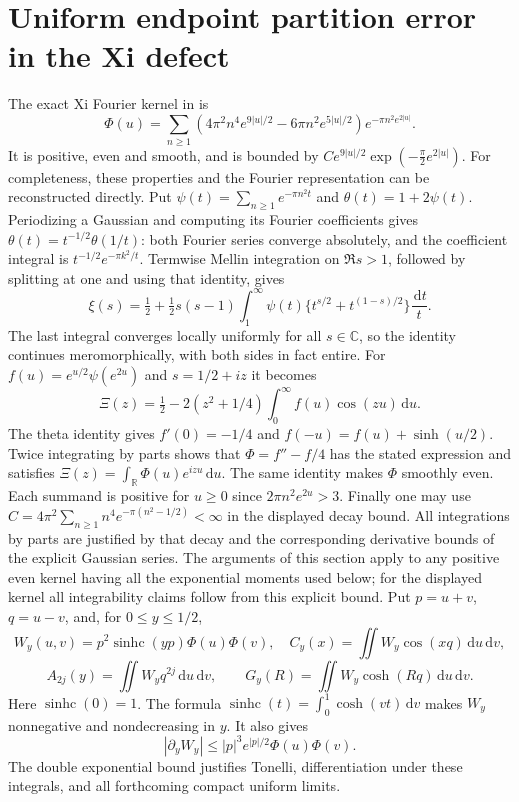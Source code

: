 \documentclass[11pt]{article}
\theoremstyle{remark}\newtheorem{remark}[theorem]{Remark}
\newcommand{\R}{\mathbb R}
\newcommand{\C}{\mathbb C}
\newcommand{\dd}{\,\mathrm d}
\newcommand{\sinhc}{\operatorname{sinhc}}
\begin{document}
\section{Uniform endpoint partition error in the Xi defect}
The exact Xi Fourier kernel in \cite[eqs. (\texttt{phi}),
(\texttt{decay})]{XiSource} is
\[
 \Phi(u)=\sum_{n\ge1}(4\pi^2n^4e^{9|u|/2}-6\pi n^2e^{5|u|/2})
             e^{-\pi n^2e^{2|u|}}.
\]
It is positive, even and smooth, and is bounded by
$C e^{9|u|/2}\exp(-\frac\pi2e^{2|u|})$.
For completeness, these properties and the Fourier representation can be
reconstructed directly. Put $\psi(t)=\sum_{n\ge1}e^{-\pi n^2t}$ and
$\theta(t)=1+2\psi(t)$. Periodizing a Gaussian and computing its Fourier
coefficients gives $\theta(t)=t^{-1/2}\theta(1/t)$: both Fourier series
converge absolutely, and the coefficient integral is
$t^{-1/2}e^{-\pi k^2/t}$.
Termwise Mellin integration on $\Re s>1$, followed by splitting at one
and using that identity, gives
\[
 \xi(s)=\tfrac12+\tfrac12s(s-1)
 \int_1^\infty\psi(t)
      \{t^{s/2}+t^{(1-s)/2}\}\frac{\dd t}{t}.
\]
The last integral converges locally uniformly for all $s\in\C$, so the
identity continues meromorphically, with both sides in fact entire.
For $f(u)=e^{u/2}\psi(e^{2u})$ and $s=1/2+iz$ it becomes
\[
 \Xi(z)=\tfrac12-2(z^2+1/4)\int_0^\infty f(u)\cos(zu)\dd u.
\]
The theta identity gives $f'(0)=-1/4$ and
$f(-u)=f(u)+\sinh(u/2)$. Twice integrating by parts shows that
$\Phi=f''-f/4$ has the stated expression and satisfies
$\Xi(z)=\int_\R\Phi(u)e^{izu}\dd u$.
The same identity makes $\Phi$ smoothly even. Each summand is positive
for $u\ge0$ since $2\pi n^2e^{2u}>3$. Finally one may use
$C=4\pi^2\sum_{n\ge1}n^4e^{-\pi(n^2-1/2)}<\infty$ in the displayed
decay bound. All integrations by parts are justified by that decay and
the corresponding derivative bounds of the explicit Gaussian series.
The arguments of this section apply to any positive even kernel having
all the exponential moments used below; for the displayed kernel all
integrability claims follow from this explicit bound.
Put $p=u+v$, $q=u-v$, and, for $0\le y\le1/2$,
\[
 W_y(u,v)=p^2\sinhc(yp)\Phi(u)\Phi(v),\quad
 C_y(x)=\iint W_y\cos(xq)\dd u\dd v,
\]
\[
 A_{2j}(y)=\iint W_yq^{2j}\dd u\dd v,\qquad
 G_y(R)=\iint W_y\cosh(Rq)\dd u\dd v.
\]
Here $\sinhc(0)=1$. The formula
$\sinhc(t)=\int_0^1\cosh(vt)\dd v$ makes $W_y$ nonnegative and
nondecreasing in $y$. It also gives
\[
 |\partial_yW_y|\le |p|^3e^{|p|/2}\Phi(u)\Phi(v).
\]
The double exponential bound justifies Tonelli, differentiation under
these integrals, and all forthcoming compact uniform limits.
\end{document}
